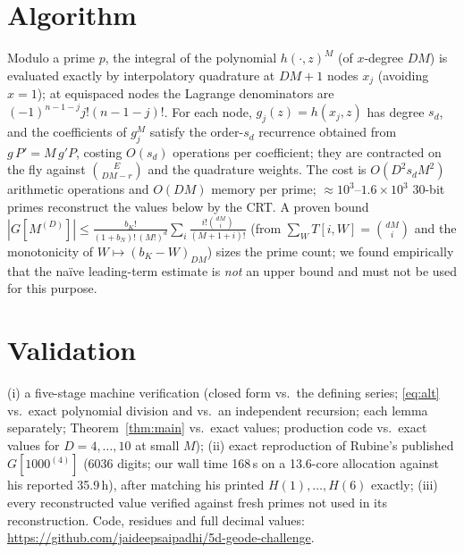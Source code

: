 \documentclass[11pt]{article}
\newcommand{\ff}[2]{(#1)_{#2}}
\begin{document}
\section{Algorithm}
Modulo a prime $p$, the integral of the polynomial $h(\cdot,z)^M$ (of $x$-degree $DM$) is
evaluated exactly by interpolatory quadrature at $DM+1$ nodes $x_j$ (avoiding $x=1$); at
equispaced nodes the Lagrange denominators are $(-1)^{n-1-j}j!(n{-}1{-}j)!$. For each node,
$g_j(z)=h(x_j,z)$ has degree $s_d$, and the coefficients of $g_j^M$ satisfy the order-$s_d$
recurrence obtained from $g\,P'=M\,g'P$, costing $O(s_d)$ operations per coefficient; they are
contracted on the fly against $\binom{E}{DM-r}$ and the quadrature weights. The cost is
$O(D^2 s_d M^2)$ arithmetic operations and $O(DM)$ memory per prime; $\approx 10^3$--$1.6\times10^3$
$30$-bit primes reconstruct the values below by the CRT. A proven bound
$|G[M^{(D)}]|\le \frac{b_K!}{(1+b_N)!\,(M!)^d}\sum_i \frac{i!\binom{dM}{i}}{(M{+}1{+}i)!}$
(from $\sum_W T[i,W]=\binom{dM}{i}$ and the monotonicity of $W\mapsto\ff{b_K-W}{DM}$) sizes the
prime count; we found empirically that the na\"ive leading-term estimate is \emph{not} an upper
bound and must not be used for this purpose.

\section{Validation}
(i) a five-stage machine verification (closed form vs.\ the defining series; \eqref{eq:alt} vs.\
exact polynomial division and vs.\ an independent recursion; each lemma separately; Theorem~\ref{thm:main}
vs.\ exact values; production code vs.\ exact values for $D=4,\dots,10$ at small $M$);
(ii) exact reproduction of Rubine's published $G[1000^{(4)}]$ (6036 digits; our wall time 168\,s
on a 13.6-core allocation against his reported 35.9\,h), after matching his printed
$H(1),\dots,H(6)$ exactly; (iii) every reconstructed value verified against fresh primes not
used in its reconstruction. Code, residues and full decimal values:
\url{https://github.com/jaideepsaipadhi/5d-geode-challenge}.
\end{document}
